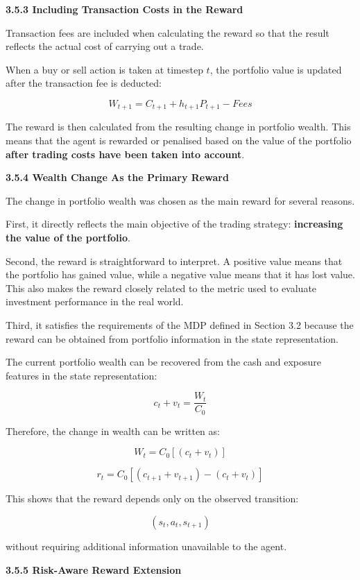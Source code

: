 \textbf{3.5.3 Including Transaction Costs in the Reward}

Transaction fees are included when calculating the reward so that the
result reflects the actual cost of carrying out a trade.

When a buy or sell action is taken at timestep \(t\), the portfolio
value is updated after the transaction fee is deducted:

\[W_{t + 1} = C_{t + 1} + h_{t + 1}P_{t + 1} - Fees\]

The reward is then calculated from the resulting change in portfolio
wealth. This means that the agent is rewarded or penalised based on the
value of the portfolio \textbf{after trading costs have been taken into
account}.

\textbf{3.5.4 Wealth Change As the Primary Reward}

The change in portfolio wealth was chosen as the main reward for several
reasons.

First, it directly reflects the main objective of the trading strategy:
\textbf{increasing the value of the portfolio}.

Second, the reward is straightforward to interpret. A positive value
means that the portfolio has gained value, while a negative value means
that it has lost value. This also makes the reward closely related to
the metric used to evaluate investment performance in the real world.

Third, it satisfies the requirements of the MDP defined in Section 3.2
because the reward can be obtained from portfolio information in the
state representation.

The current portfolio wealth can be recovered from the cash and exposure
features in the state representation:

\[c_{t} + v_{t} = \frac{W_{t}}{C_{0}}\]

Therefore, the change in wealth can be written as:

\[W_{t} = C_{0}\left\lbrack \left( c_{t} + v_{t} \right) \right\rbrack\]

\[r_{t} = C_{0}\left\lbrack \left( c_{t + 1} + v_{t + 1} \right) - \left( c_{t} + v_{t} \right) \right\rbrack\]

This shows that the reward depends only on the observed transition:

\[\left( s_{t},a_{t},s_{t + 1} \right)\]

without requiring additional information unavailable to the agent.

\textbf{3.5.5 Risk-Aware Reward Extension}

